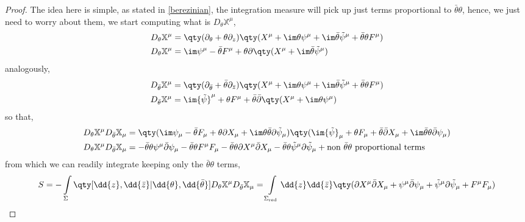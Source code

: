 \begin{proof}
    The idea here is simple, as stated in \cref{berezinian}, the integration measure will pick up just terms proportional to $\bar\theta\theta$, 
    hence, we just need to worry about them, we start computing what is $D_\theta\mathbb X^\mu$,
    \begin{align*}
        D_\theta \mathbb X^\mu&=\qty(\partial_\theta+\theta\partial_z)\qty(X^\mu+\im\theta\psi^\mu+\im\bar\theta{\tilde\psi}^\mu+\bar\theta\theta F^\mu)\\
        D_\theta \mathbb X^\mu&=\im\psi^\mu-\bar\theta F^\mu+\theta\partial\qty(X^\mu+\im\bar\theta{\tilde\psi}^\mu)
    \end{align*}
    analogously,
    \begin{align*}
        D_{\bar\theta} \mathbb X^\mu&=\qty(\partial_{\bar\theta}+\bar\theta\partial_{\bar z})\qty(X^\mu+\im\theta\psi^\mu+\im\bar\theta{\tilde\psi}^\mu+\bar\theta\theta F^\mu)\\
        D_{\bar\theta} \mathbb X^\mu&=\im{\tilde\psi}^\mu+\theta F^\mu+\bar\theta\bar\partial\qty(X^\mu+\im\theta{\psi}^\mu)
    \end{align*}
    so that,
    \begin{align*}
        D_\theta \mathbb X^\mu D_{\bar\theta} \mathbb X_\mu&=\qty(\im\psi_\mu-\bar\theta F_\mu+\theta\partial X_\mu+\im\theta\bar\theta\partial{\tilde\psi}_\mu)\qty(\im{\tilde\psi}_\mu+\theta F_\mu+\bar\theta\bar\partial X_\mu+\im\bar\theta\theta\bar\partial{\psi}_\mu)\\
        D_\theta \mathbb X^\mu D_{\bar\theta} \mathbb X_\mu&=-\bar\theta\theta\psi^\mu\bar\partial\psi_\mu-\bar\theta\theta F^\mu F_\mu-\bar\theta\theta\partial X^\mu\bar\partial X_\mu-\bar\theta\theta{\tilde\psi}^\mu\partial{\tilde\psi}_\mu+\textnormal{non }\bar\theta\theta\textnormal{ proportional terms}
    \end{align*}
    from which we can readily integrate keeping only the $\bar\theta\theta$ terms,
    \begin{align*}
        S=-\int\limits_\Sigma\qty[\dd{z},\dd{\bar z}|\dd{\theta},\dd{\bar\theta}]D_\theta \mathbb X^\mu D_{\bar\theta}\mathbb X_\mu=\int\limits_{\Sigma_{\textnormal{red}}}\dd{z}\dd{\bar z}\qty(\partial X^\mu\bar\partial X_\mu+\psi^\mu\bar\partial\psi_\mu+{\tilde\psi}^\mu\partial{\tilde\psi}_\mu+F^\mu F_\mu)
    \end{align*}
\end{proof}

